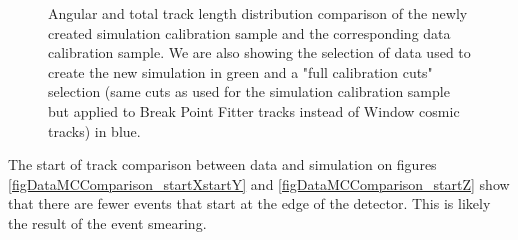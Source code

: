 \documentclass[12pt]{article}
\begin{document}
\begin{figure}[!ht]

\caption{Angular and total track length distribution comparison of the newly created simulation calibration sample and the corresponding data calibration sample. We are also showing the selection of data used to create the new simulation in green and a "full calibration cuts" selection (same cuts as used for the simulation calibration sample but applied to Break Point Fitter tracks instead of Window cosmic tracks) in blue.}
\label{figDataMCComparison_cosZtotLength}
\end{figure}

The start of track comparison between data and simulation on figures \ref{figDataMCComparison_startXstartY} and \ref{figDataMCComparison_startZ} show that there are fewer events that start at the edge of the detector. This is likely the result of the event smearing.
\end{document}
